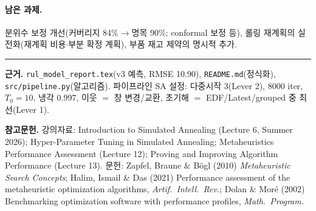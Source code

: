 \documentclass[11pt]{article}
\begin{document}
\paragraph{남은 과제.}
분위수 보정 개선(커버리지 84\%$\to$명목 90\%; conformal 보정 등),
롤링 재계획의 실전화(재계획 비용$\cdot$부분 확정 계획), 부품 재고 제약의 명시적 추가.

\vspace{1em}
\hrule
\vspace{0.6em}
\small
\textbf{근거.} \texttt{rul\_model\_report.tex}(v3 예측, RMSE 10.90), \texttt{README.md}(정식화), \texttt{src/pipeline.py}(알고리즘).
파이프라인 SA 설정: 다중시작 3(Lever 2), 8000 iter, $T_0{=}10$, 냉각 0.997, 이웃 $=$ 창 변경/교환, 초기해 $=$ EDF/Latest/grouped 중 최선(Lever 1).

\textbf{참고문헌.}
강의자료: Introduction to Simulated Annealing (Lecture 6, Summer 2026);
Hyper-Parameter Tuning in Simulated Annealing;
Metaheuristics Performance Assessment (Lecture 12);
Proving and Improving Algorithm Performance (Lecture 13).
문헌: Zapfel, Braune \& B\"ogl (2010) \emph{Metaheuristic Search Concepts};
Halim, Ismail \& Das (2021) Performance assessment of the metaheuristic optimization algorithms, \emph{Artif.\ Intell.\ Rev.};
Dolan \& Mor\'e (2002) Benchmarking optimization software with performance profiles, \emph{Math.\ Program.}
\end{document}
